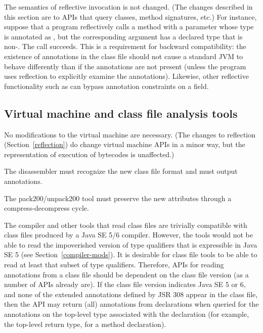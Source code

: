 \documentclass[10pt]{article}
\begin{document}
The semantics of reflective invocation is not changed.
(The changes described in this section are to APIs that query classes,
method signatures, etc.)
For instance, suppose that a program reflectively calls a method
with a parameter whose type is annotated as , but the
corresponding argument has a declared type that is non-.
The call succeeds.  This is a requirement for backward compatibility:  the
existence of annotations in the class file should not cause a standard JVM
to behave differently than if the annotations are not present (unless the
program uses reflection to explicitly examine the annotations).  Likewise,
other reflective functionality such as 
can bypass annotation constraints on a field.



\subsection{Virtual machine and class file analysis tools\label{class-file-tools}}

No modifications to the virtual machine are necessary.
(The changes to reflection (Section~\ref{reflection}) do change virtual
machine APIs in a minor way, but the representation of execution of
bytecodes is unaffected.)

The  disassembler must recognize the new class
file format and must output annotations.

The pack200/unpack200 tool must preserve the new attributes through a
compress-decompress cycle.


The compiler and other tools that read class files are trivially compatible
with class files produced by a Java SE 5/6 compiler.  However, the tools
would not be able to read the impoverished version of type qualifiers that
is expressible in Java SE 5 (see Section~\ref{compiler-mods}).  It is
desirable for class file tools to be able to read at least that subset of
type qualifiers.  Therefore, APIs for reading annotations from a class file
should be dependent on the class file version (as a number of APIs already
are).  If the class file version indicates Java SE 5 or 6, and none of the
extended annotations defined by JSR 308 appear in the class file, then the
API may return (all) annotations from declarations when queried for the
annotations on the top-level type associated with the declaration (for
example, the top-level return type, for a method declaration).
\end{document}
